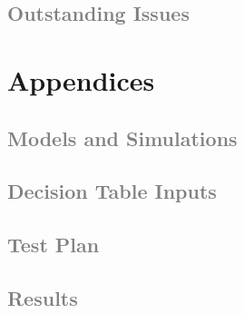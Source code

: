 \documentclass[a4paper,12pt]{report}
\begin{document}
\subsection{\textcolor{gray}{Outstanding Issues}}
\section{Appendices}
\subsection{\textcolor{gray}{Models and Simulations}}
\subsection{\textcolor{gray}{Decision Table Inputs}}
\subsection{\textcolor{gray}{Test Plan}}
\subsection{\textcolor{gray}{Results}}
\end{document}
